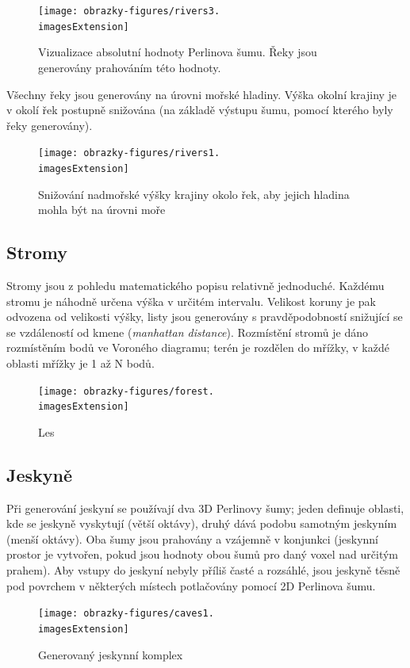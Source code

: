 \begin{figure}[H]
	\texttt{[image: obrazky-figures/rivers3.\\imagesExtension]}
	\caption{Vizualizace absolutní hodnoty Perlinova šumu. Řeky jsou generovány prahováním této hodnoty.}
\end{figure}

\vfill

Všechny řeky jsou generovány na úrovni mořské hladiny. Výška okolní krajiny je v okolí řek postupně snižována (na základě výstupu šumu, pomocí kterého byly řeky generovány).

\begin{figure}[H]
	\texttt{[image: obrazky-figures/rivers1.\\imagesExtension]}
	\caption{Snižování nadmořské výšky krajiny okolo řek, aby jejich hladina mohla být na úrovni moře}
\end{figure}

\subsection{Stromy}
Stromy jsou z pohledu matematického popisu relativně jednoduché. Každému stromu je náhodně určena výška v určitém intervalu. Velikost koruny je pak odvozena od velikosti výšky, listy jsou generovány s pravděpodobností snižující se se vzdáleností od kmene (\textit{manhattan distance}). Rozmístění stromů je dáno rozmístěním bodů ve Voroného diagramu; terén je rozdělen do mřížky, v každé oblasti mřížky je 1 až N bodů.

\begin{figure}[H]
	\texttt{[image: obrazky-figures/forest.\\imagesExtension]}
	\caption{Les}
\end{figure}

\subsection{Jeskyně}
Při generování jeskyní se používají dva 3D Perlinovy šumy; jeden definuje oblasti, kde se jeskyně vyskytují (větší oktávy), druhý dává podobu samotným jeskyním (menší oktávy). Oba šumy jsou prahovány a vzájemně v konjunkci (jeskynní prostor je vytvořen, pokud jsou hodnoty obou šumů pro daný voxel nad určitým prahem). Aby vstupy do jeskyní nebyly příliš časté a rozsáhlé, jsou jeskyně těsně pod povrchem v některých místech potlačovány pomocí 2D Perlinova šumu.

\begin{figure}[H]
	\texttt{[image: obrazky-figures/caves1.\\imagesExtension]}
	\caption{Generovaný jeskynní komplex}
\end{figure}

